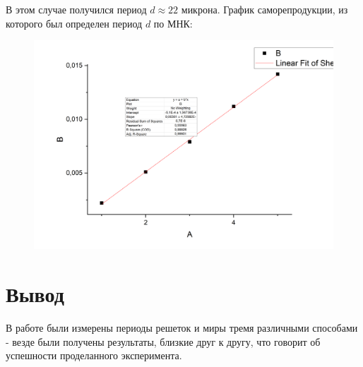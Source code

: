\documentclass[a4paper,12pt]{article}
\begin{document}
В этом случае получился период $d \approx 22$ микрона.
График саморепродукции, из которого был определен период $d$ по МНК: 
\begin{figure}[h!]
	\begin{center}
		\includegraphics[scale = 0.4]{мира.png}
	\end{center}
\end{figure}

\section{Вывод}

В работе были измерены периоды решеток и миры тремя различными способами - везде были получены результаты, близкие друг к другу, что говорит об успешности проделанного эксперимента.
\end{document}
